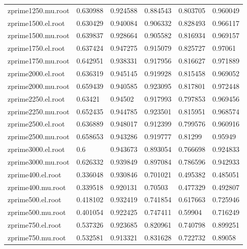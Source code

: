 \begin{table}[H]
\begin{tabular}{l|lllll}
    zprime1250.mu.root & 0.630988   & 0.924588 & 0.884543 & 0.803705 & 0.960049  \\
    zprime1500.el.root & 0.630429   & 0.940084 & 0.906332 & 0.828493 & 0.966117  \\
    zprime1500.mu.root & 0.639837   & 0.928664 & 0.905582 & 0.816934 & 0.969157  \\
    zprime1750.el.root & 0.637424   & 0.947275 & 0.915079 & 0.825727 & 0.97061   \\
    zprime1750.mu.root & 0.642951   & 0.938331 & 0.917956 & 0.816627 & 0.971889  \\
    zprime2000.el.root & 0.636319   & 0.945145 & 0.919928 & 0.815458 & 0.969052  \\
    zprime2000.mu.root & 0.659439   & 0.940585 & 0.923095 & 0.817801 & 0.972448  \\
    zprime2250.el.root & 0.63421    & 0.94502  & 0.917993 & 0.797853 & 0.969456  \\
    zprime2250.mu.root & 0.652435   & 0.944785 & 0.923501 & 0.815951 & 0.968574  \\
    zprime2500.el.root & 0.636889   & 0.948017 & 0.912399 & 0.799576 & 0.960916  \\
    zprime2500.mu.root & 0.658653   & 0.943286 & 0.919777 & 0.81299  & 0.95949   \\
    zprime3000.el.root & 0.6        & 0.943673 & 0.893054 & 0.766698 & 0.924833  \\
    zprime3000.mu.root & 0.626332   & 0.939849 & 0.897084 & 0.786596 & 0.942933  \\
    zprime400.el.root  & 0.336048   & 0.930846 & 0.701021 & 0.495382 & 0.485051  \\
    zprime400.mu.root  & 0.339518   & 0.920131 & 0.70503  & 0.477329 & 0.492807  \\
    zprime500.el.root  & 0.418102   & 0.932419 & 0.741854 & 0.617663 & 0.725946  \\
    zprime500.mu.root  & 0.401054   & 0.922425 & 0.747411 & 0.59904  & 0.716249  \\
    zprime750.el.root  & 0.537326   & 0.923685 & 0.820961 & 0.740798 & 0.899251  \\
    zprime750.mu.root  & 0.532581   & 0.913321 & 0.831628 & 0.722732 & 0.89058
  \end{tabular}
  \label{tab:eff_a}

\end{table}

